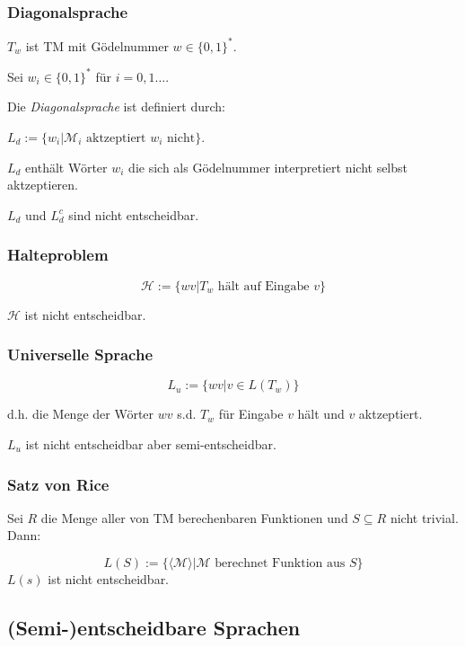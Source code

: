 \subsubsection*{Diagonalsprache}

$T_w$ ist TM mit Gödelnummer $w \in \{0,1\}^*$.

Sei $w_i \in \{0,1\}^*$ für $i = 0,1\dots$.

\spacing

Die \emph{Diagonalsprache} ist definiert durch:

$L_d := \{ w_i | \mathcal{M}_i \text{ aktzeptiert } w_i \text{ nicht} \}$.

$L_d$ enthält Wörter $w_i$ die sich als Gödelnummer interpretiert nicht selbst aktzeptieren.

\spacing

$L_d$ und $L_d^c$ sind nicht entscheidbar.

\subsubsection*{Halteproblem}

\[ \mathcal{H} := \{ wv | T_w \text{ hält auf Eingabe } v \} \]

$\mathcal{H}$ ist nicht entscheidbar.

\subsubsection*{Universelle Sprache}

\[ L_u := \{ wv | v \in L(T_w) \} \]

d.h. die Menge der Wörter $wv$ s.d. $T_w$ für Eingabe $v$ hält und $v$ aktzeptiert.

$L_u$ ist nicht entscheidbar aber semi-entscheidbar.

\subsubsection*{Satz von Rice}

Sei $R$ die Menge aller von TM berechenbaren Funktionen und $S \subseteq R$ nicht trivial. Dann:

\vspace*{-4mm}
\[ L(S) := \{ \langle\mathcal{M}\rangle | \mathcal{M} \text{ berechnet Funktion aus } S \} \]
$L(s)$ ist nicht entscheidbar.

\subsection*{(Semi-)entscheidbare Sprachen}

